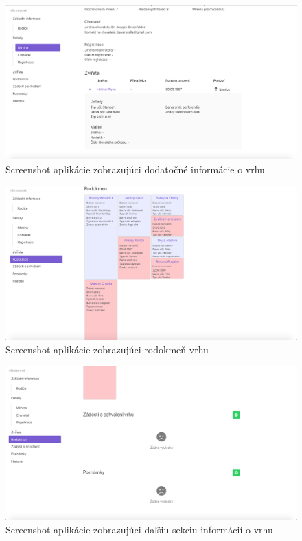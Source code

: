 \begin{figure}[H]
	\includegraphics[width=1.0\textwidth]{media/priloha/vrh/3.png}
	\caption{Screenshot aplikácie zobrazujúci dodatočné informácie o vrhu}
\end{figure}

\begin{figure}[H]
	\includegraphics[width=1.0\textwidth]{media/priloha/vrh/4.png}
	\caption{Screenshot aplikácie zobrazujúci rodokmeň vrhu}
\end{figure}

\begin{figure}[H]
	\includegraphics[width=1.0\textwidth]{media/priloha/vrh/5.png}
	\caption{Screenshot aplikácie zobrazujúci ďaľšiu sekciu informácií o vrhu}
\end{figure}

